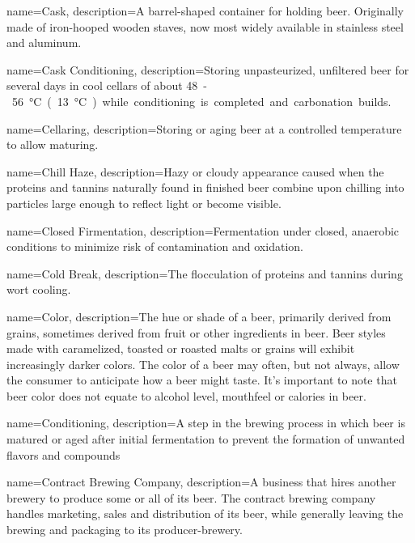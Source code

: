 {
  name={Cask},
  description={A barrel-shaped container for holding beer. Originally made of iron-hooped wooden staves, now most widely available in stainless steel and aluminum.}
  }

{
  name={Cask Conditioning},
  description={Storing unpasteurized, unfiltered beer for several days in cool cellars of about \SI{48}-\SI{56}\celsius (\SI{13}\celsius) while conditioning is completed and carbonation builds.}
  }

{
  name={Cellaring},
  description={Storing or aging beer at a controlled temperature to allow maturing.}
}

{
  name={Chill Haze},
  description={Hazy or cloudy appearance caused when the proteins and tannins naturally found in finished beer combine upon chilling into particles large enough to reflect light or become visible.}
  }

{
  name={Closed Firmentation},
  description={Fermentation under closed, anaerobic conditions to minimize risk of contamination and oxidation.}
  }

{
  name={Cold Break},
  description={The flocculation of proteins and tannins during wort cooling.}
  }

{
  name={Color},
  description={The hue or shade of a beer, primarily derived from grains, sometimes derived from fruit or other ingredients in beer. Beer styles made with caramelized, toasted or roasted malts or grains will exhibit increasingly darker colors. The color of a beer may often, but not always, allow the consumer to anticipate how a beer might taste. It’s important to note that beer color does not equate to alcohol level, mouthfeel or calories in beer.}
  }

{
  name={Conditioning},
  description={A step in the brewing process in which beer is matured or aged after initial fermentation to prevent the formation of unwanted flavors and compounds}
  }

{
  name={Contract Brewing Company},
  description={A business that hires another brewery to produce some or all of its beer. The contract brewing company handles marketing, sales and distribution of its beer, while generally leaving the brewing and packaging to its producer-brewery.}
  }

